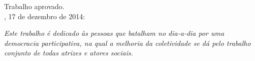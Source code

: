 \documentclass[
  12pt,                                         %
  openright,                                   %
  openany,
  twoside,                                     %
  a4paper,                                      %
  inline,
  english,                                      %
  brazil,                                       %
  ]{abntex2}
\begin{document}
%
% 
%
\begin{folhadeaprovacao}
  \begin{center}
    {\ABNTEXchapterfont\large\imprimirautor}

    \vspace*{\fill}\vspace*{\fill}
    \begin{center}
      \ABNTEXchapterfont\bfseries\Large\imprimirtitulo
    \end{center}
    \vspace*{\fill}

    \hspace{.45\textwidth}
    \begin{minipage}{.5\textwidth}
        \imprimirpreambulo
    \end{minipage}%
    \vspace*{\fill}

   Trabalho aprovado. \\
   \imprimirlocal, 17 de dezembro de 2014: 
   \end{center}


   \begin{center}
    \vspace*{0.5cm}
    {\large\imprimirlocal}
    \par
    {\large\imprimirdata}
    \vspace*{1cm}
  \end{center}
\end{folhadeaprovacao}

\begin{dedicatoria}
   \vspace*{\fill}
   \centering
   \noindent
   \textit{Este trabalho é dedicado às pessoas que batalham no dia-a-dia por uma democracia participativa, na qual a melhoria da coletividade se dá pelo trabalho conjunto de todas atrizes e atores sociais.} \vspace*{\fill} %
\end{dedicatoria}
\end{document}
